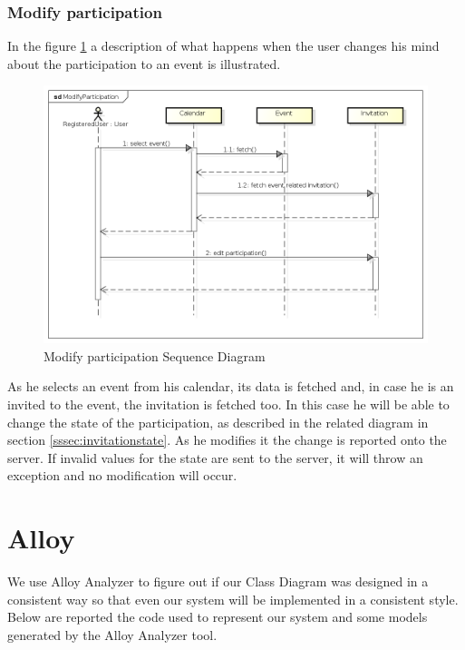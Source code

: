 \subsubsection{Modify participation}
In the figure \ref{fig:modpartseqdiag} a description of what happens when the user changes his mind about the participation to an event is illustrated.
\begin{center}
 \begin{figure}[H]
    \includegraphics[width=1\textwidth]{./UMLDiagram/sequence/ModifyParticipation/ModifyParticipation.png}
    \caption{Modify participation Sequence Diagram}
     \label{fig:modpartseqdiag}
     \end{figure}
   \end{center}
As he selects an event from his calendar, its data is fetched and, in case he is an invited to the event, the invitation is fetched too. In this case he will be able to change the state of the participation, as described in the related diagram in section \ref{sssec:invitationstate}. As he modifies it the change is reported onto the server. If invalid values for the state are sent to the server, it will throw an exception and no modification will occur. 
\section{Alloy}
We use Alloy Analyzer to figure out if our Class Diagram was designed in a consistent way so that even our system will be implemented in a consistent style.\\
Below are reported the code used to represent our system and some models generated by the Alloy Analyzer tool.
